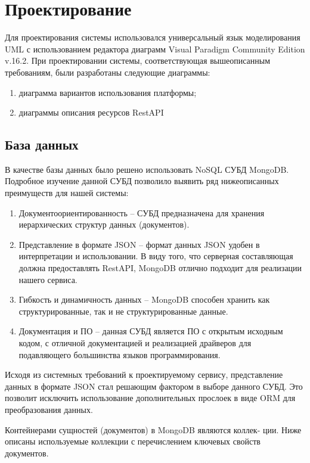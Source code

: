 \section{Проектирование}
Для проектирования системы использовался универсальный язык моделирования UML с использованием редактора диаграмм Visual Paradigm Community Edition v.16.2. При проектировании системы, соответствующая вышеописанным требованиям, были разработаны следующие диаграммы:

\begin{enumerate}
	\item диаграмма вариантов использования платформы;
	\item диаграммы описания ресурсов RestAPI 
\end{enumerate}

\subsection{База данных}
В качестве базы данных было решено использовать NoSQL СУБД MongoDB. Подробное изучение данной СУБД позволило выявить ряд нижеописанных преимуществ для нашей системы:
\begin{enumerate}
	\item Документоориентированность – СУБД предназначена для хранения иерархических структур данных (документов).
	\item Представление в формате JSON – формат данных JSON удобен в интерпретации и использовании. В виду того, что серверная составляющая должна предоставлять RestAPI, MongoDB отлично подходит для реализации нашего сервиса.
	\item Гибкость и динамичность данных – MongoDB способен хранить
	как структурированные, так и не структурированные данные.
	\item Документация и ПО – данная СУБД является ПО с открытым исходным кодом, с отличной документацией и реализацией драйверов для подавляющего большинства языков программирования.
\end{enumerate}
Исходя из системных требований к проектируемому сервису, представление данных в формате JSON стал решающим фактором в выборе данного СУБД. Это позволит исключить использование дополнительных прослоек в виде ORM для преобразования данных.

Контейнерами сущностей (документов) в MongoDB являются коллек-
ции. Ниже описаны используемые коллекции с перечислением ключевых свойств документов.

